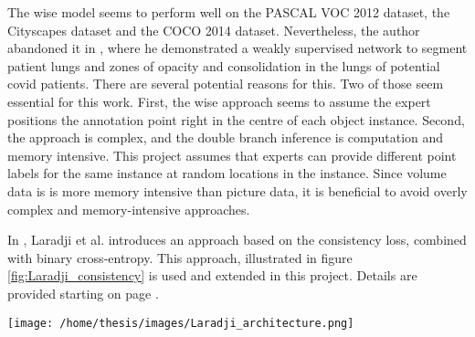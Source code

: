 \par{
    The \Gls{wise} model seems to perform well on the PASCAL VOC 2012 dataset, the Cityscapes dataset and the COCO 2014 dataset. 
    Nevertheless, the author abandoned it in \cite{Laradji2020}, where he demonstrated a weakly supervised network to segment patient lungs and zones of opacity and consolidation in the lungs of potential \Gls{covid} patients.
    There are several potential reasons for this. 
    Two of those seem essential for this work. 
    First, the \Gls{wise} approach seems to assume the expert positions the annotation point right in the centre of each object instance.
    Second, the approach is complex, and the double branch inference is computation and memory intensive. 
    This project assumes that experts can provide different point labels for the same instance at random locations in the instance.
    Since volume data is is more memory intensive than picture data, it is beneficial to avoid overly complex and memory-intensive approaches.
}
\par{
    In \cite{Laradji2020}, Laradji et al. introduces an approach based on the consistency loss, combined with binary cross-entropy.
    This approach, illustrated in figure \ref{fig:Laradji_consistency} is used and extended in this project.
    Details are provided starting on page \pageref{sec:model_concept}.
}
\begin{SCfigure}[][htb]
    \texttt{[image: /home/thesis/images/Laradji\_architecture.png]}
    \caption{Illustration from \cite{Laradji2020}. The consistency loss approach is based on the combination of two loss terms: the unsupervised consistency loss and the (weakly) supervised point (cross entropy) loss.}
    \label{fig:Laradji_consistency}
\end{SCfigure}